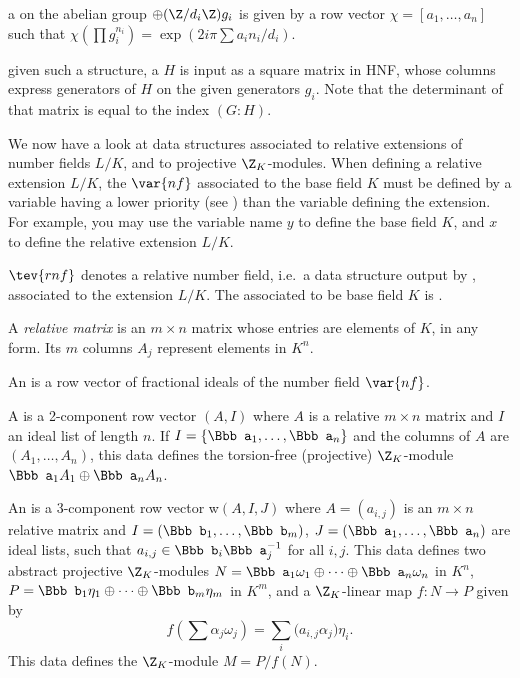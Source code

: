 \item a  on the abelian group
$\oplus (\Z/d_i\Z) g_i$
is given by a row vector $\chi = [a_1,\ldots,a_n]$ such that
$\chi(\prod g_i^{n_i}) = \exp(2i\pi\sum a_i n_i / d_i)$.

\item given such a structure, a  $H$ is input as a square
matrix in HNF, whose columns express generators of $H$ on the given generators
$g_i$. Note that the determinant of that matrix is equal to the index $(G:H)$.


We now have a look at data structures associated to relative extensions
of number fields $L/K$, and to projective $\Z_K$-modules. When defining a
relative extension $L/K$, the $\var{nf}$ associated to the base field $K$
must be defined by a variable having a lower priority (see
) than the variable defining the extension. For example,
you may use the variable name $y$ to define the base field $K$, and $x$ to
define the relative extension $L/K$.

\label{se:ZKmodules}

\item $\tev{rnf}$ denotes a relative number field, i.e.~a data structure
output by , associated to the extension $L/K$. The 
associated to be base field $K$ is .

\item A \emph{relative matrix} is an $m\times n$ matrix whose entries are
elements of $K$, in any form. Its $m$ columns $A_j$ represent elements
in $K^n$.

\item An  is a row vector of fractional ideals of the number
field $\var{nf}$.

\item A  is a 2-component row vector $(A,I)$ where $A$
is a relative $m\times n$ matrix and $I$ an ideal list of length $n$. If $I =
\{{\Bbb a}_1,\dots, {\Bbb a}_n\}$ and the columns of $A$ are $(A_1,\dots,
A_n)$, this data defines the torsion-free (projective) $\Z_K$-module ${\Bbb
a}_1 A_1\oplus {\Bbb a}_n A_n$.

\item An  is a 3-component row vector w$(A,I,J)$
where $A = (a_{i,j})$ is an $m\times n$ relative matrix and $I = ({\Bbb
b}_1,\dots, {\Bbb b}_m)$, $J = ({\Bbb a}_1,\dots, {\Bbb a}_n)$ are ideal
lists, such that $a_{i,j} \in {\Bbb b}_i {\Bbb a}_j^{-1}$ for all $i,j$. This
data defines two abstract projective $\Z_K$-modules $N = {\Bbb
a_1}\omega_1\oplus \cdots\oplus {\Bbb a_n}\omega_n $ in $K^n$, $P = {\Bbb
b_1}\eta_1\oplus \cdots\oplus {\Bbb b_m}\eta_m$ in $K^m$, and a $\Z_K$-linear
map $f:N\to P$ given by
$$ f(\sum \alpha_j\omega_j) = \sum_i \Big(a_{i,j}\alpha_j\Big) \eta_i.$$
This data defines the $\Z_K$-module $M = P/f(N)$.

